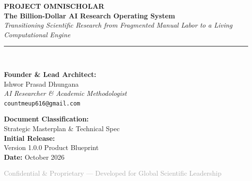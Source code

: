 \documentclass[11pt,a4paper]{article}
\begin{document}
\begin{titlepage}
    \centering
    \vspace*{2cm}
    
    {\Huge \textbf{\textcolor{primaryblue}{PROJECT OMNISCHOLAR}}}\\[0.6cm]
    {\LARGE \textbf{The Billion-Dollar AI Research Operating System}}\\[0.4cm]
    {\large \textit{Transitioning Scientific Research from Fragmented Manual Labor to a Living Computational Engine}}\\[1.5cm]
    
    \rule{\linewidth}{1.5pt}\\[1.5cm]
    
    \begin{minipage}{0.48\textwidth}
        \textbf{Founder \& Lead Architect:}\\
        Ishwor Prasad Dhungana\\
        \textit{AI Researcher \& Academic Methodologist}\\
        \texttt{countmeup616@gmail.com}
    \end{minipage}
    \hfill
    \begin{minipage}{0.48\textwidth}
        \begin{flushright}
            \textbf{Document Classification:}\\
            Strategic Masterplan \& Technical Spec\\
            \textbf{Initial Release:}\\
            Version 1.0.0 Product Blueprint\\
            \textbf{Date:} October 2026
        \end{flushright}
    \end{minipage}
    
    \vfill
    
    {\small \textcolor{darkgray}{Confidential \& Proprietary --- Developed for Global Scientific Leadership}}
\end{titlepage}

\tableofcontents
\newpage
\end{document}
